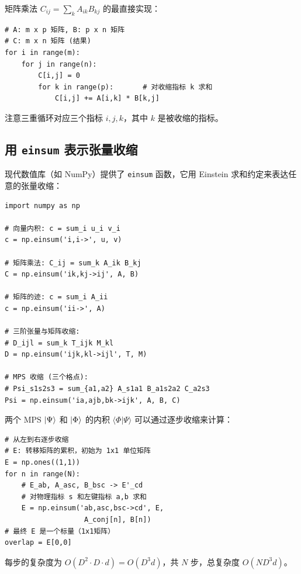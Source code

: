 \documentclass[12pt,a4paper]{ctexart}
\begin{document}
矩阵乘法 $C_{ij} = \sum_k A_{ik} B_{kj}$ 的最直接实现：

\begin{tcolorbox}[colback=gray!5, colframe=gray!60, fonttitle=\bfseries, title=矩阵乘法的显式循环实现]
\begin{verbatim}
# A: m x p 矩阵, B: p x n 矩阵
# C: m x n 矩阵 (结果)
for i in range(m):
    for j in range(n):
        C[i,j] = 0
        for k in range(p):       # 对收缩指标 k 求和
            C[i,j] += A[i,k] * B[k,j]
\end{verbatim}
\end{tcolorbox}

注意三重循环对应三个指标 $i, j, k$，其中 $k$ 是被收缩的指标。

\subsection{用 \texttt{einsum} 表示张量收缩}

现代数值库（如 NumPy）提供了 \texttt{einsum} 函数，它用 Einstein 求和约定来表达任意的张量收缩：

\begin{tcolorbox}[colback=gray!5, colframe=gray!60, fonttitle=\bfseries, title=用 einsum 实现各种张量收缩]
\begin{verbatim}
import numpy as np

# 向量内积: c = sum_i u_i v_i
c = np.einsum('i,i->', u, v)

# 矩阵乘法: C_ij = sum_k A_ik B_kj
C = np.einsum('ik,kj->ij', A, B)

# 矩阵的迹: c = sum_i A_ii
c = np.einsum('ii->', A)

# 三阶张量与矩阵收缩:
# D_ijl = sum_k T_ijk M_kl
D = np.einsum('ijk,kl->ijl', T, M)

# MPS 收缩 (三个格点):
# Psi_s1s2s3 = sum_{a1,a2} A_s1a1 B_a1s2a2 C_a2s3
Psi = np.einsum('ia,ajb,bk->ijk', A, B, C)
\end{verbatim}
\end{tcolorbox}

\begin{examplebox}
两个 MPS $\ket{\Psi}$ 和 $\ket{\Phi}$ 的内积 $\langle\Phi|\Psi\rangle$ 可以通过逐步收缩来计算：

\begin{verbatim}
# 从左到右逐步收缩
# E: 转移矩阵的累积，初始为 1x1 单位矩阵
E = np.ones((1,1))
for n in range(N):
    # E_ab, A_asc, B_bsc -> E'_cd
    # 对物理指标 s 和左键指标 a,b 求和
    E = np.einsum('ab,asc,bsc->cd', E,
                   A_conj[n], B[n])
# 最终 E 是一个标量（1x1矩阵）
overlap = E[0,0]
\end{verbatim}

每步的复杂度为 $O(D^2 \cdot D \cdot d) = O(D^3 d)$，共 $N$ 步，总复杂度 $O(ND^3 d)$。
\end{examplebox}
\end{document}

